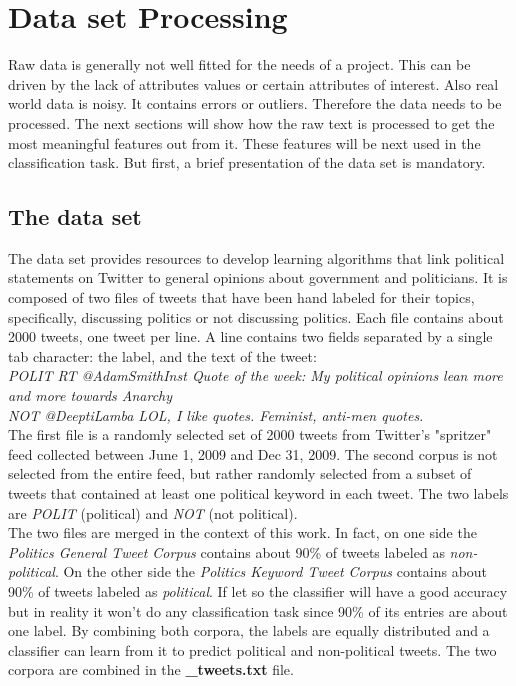 
\chapter{Data set Processing} %

\label{Chapter3} %



Raw data is generally not well fitted for the needs of a project.  
This can be driven by the lack of attributes values or certain attributes of interest. 
Also real world data is noisy. It contains errors or outliers.  
Therefore the data needs to be processed. 
The next sections will show how the raw text is processed to get the most meaningful features out from it.
These features will be next used in the classification task. 
But first, a brief presentation of the data set is mandatory. 




\section{The data set}
The data set\cite{website:data_set} provides resources to develop learning algorithms that link political statements on Twitter to general opinions about government and politicians. It is composed of two files of tweets that have been hand labeled for their topics, specifically, discussing politics or not discussing politics.
Each file contains about 2000 tweets, one tweet per line. A line contains two fields separated by a single tab character: the label, and the text of the tweet:\\
\emph{POLIT     RT @AdamSmithInst Quote of the week: My political opinions lean more and more towards Anarchy }\\
\emph{NOT     @DeeptiLamba LOL, I like quotes. Feminist, anti-men quotes.}\\
The first file is a randomly selected set of 2000 tweets from Twitter's "spritzer" feed collected between June 1, 2009 and Dec 31, 2009. The second corpus is not selected from the entire feed, but rather randomly selected from a subset of tweets that contained at least one political keyword in each tweet.
The two labels are \emph{POLIT} (political) and \emph{NOT} (not political).\\
The two files are merged in the context of this work. In fact, on one side the \emph{Politics General Tweet Corpus} contains about 90\% of tweets labeled as \emph{non-political}. On the other side the \emph{Politics Keyword Tweet Corpus} contains about 90\% of tweets labeled as \emph{political}. If let so the classifier will have a good accuracy but in reality it won't do any classification task since 90\% of its entries are about one label.
By combining both corpora, the labels are equally distributed and a classifier can learn from it to predict political and non-political tweets. 
The two corpora are combined in the \textbf{\_tweets.txt} file.

